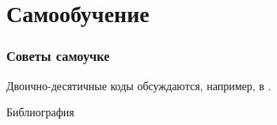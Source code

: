 \section{Самообучение}


\begin{frame}
    \frametitle{Советы самоучке}

    Двоично-десятичные коды обсуждаются, например, в \cite{bib:zubchuk:schemo, bib:lisikov:automateBase}.
\end{frame}

\begin{frame}[allowframebreaks]{Библиография}
    
    
\end{frame}






